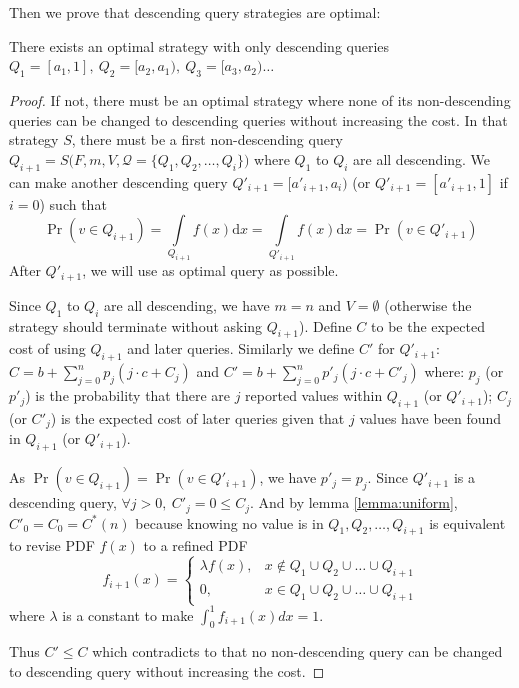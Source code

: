 Then we prove that descending query strategies are optimal:
\begin{lemma}\label{lemma:descending}

There exists an optimal strategy with only descending queries
$Q_1 = [a_1, 1], ~Q_2 = [a_2, a_1), ~Q_3 = [a_3, a_2)\ldots$

\end{lemma}

\begin{proof}

If not, there must be an optimal strategy where none of its
non-descending queries can be changed to descending queries without increasing
the cost. In that strategy $S$, there must be a first non-descending query
$Q_{i+1} = S\big(F, m, V, \mathcal Q = \{Q_1, Q_2, \ldots, Q_i\}\big)$ where
$Q_1$ to $Q_i$ are all descending.  We can make another descending query
$Q'_{i+1} = [a'_{i+1}, a_i)$ (or $Q'_{i+1} = [a'_{i+1}, 1]$ if $i = 0$) such
that
\[
\Pr(v \in Q_{i+1}) = \int \limits_{Q_{i+1}} f(x) \mathrm d x = \int \limits_{Q'_{i+1}} f(x) \mathrm d x = \Pr(v \in Q'_{i+1})
\]
After $Q'_{i+1}$, we will use as optimal query as
possible.

Since $Q_1$ to $Q_i$ are all descending, we have $m = n$ and $V = \emptyset$ (otherwise
the strategy should terminate without asking $Q_{i+1}$).
Define $C$ to be the expected cost of using $Q_{i+1}$ and later queries. Similarly we define $C'$ for $Q'_{i+1}$:\\
$
C = b + \sum_{j=0}^n p_j ( j \cdot c + C_j)
$
and
$
C' = b + \sum_{j=0}^n p'_j ( j \cdot c + C'_j)
$
where:
$p_j$ (or $p'_j$) is the probability that there are $j$ reported values within $Q_{i+1}$ (or $Q'_{i+1}$);
$C_j$ (or $C'_j$) is the expected cost of later queries given that $j$ values have been
found in $Q_{i+1}$ (or $Q'_{i+1}$).

As $\Pr(v \in Q_{i+1}) = \Pr(v \in Q'_{i+1})$, we have $p'_j = p_j$. Since $Q'_{i+1}$ is a
descending query, $\forall j > 0, ~C'_j = 0 \leq C_j$. And by lemma \ref{lemma:uniform},
$C'_0 = C_0 = C^*(n)$ because knowing no value is in $Q_1, Q_2, \ldots, Q_{i+1}$ is equivalent
to revise PDF $f(x)$ to a refined PDF 
\[
f_{i+1}(x) = \begin{cases}
	\lambda f(x), & x \notin Q_1 \cup Q_2 \cup \ldots \cup Q_{i+1} \\
	0, & x \in Q_1 \cup Q_2 \cup \ldots \cup Q_{i+1}
\end{cases}
\]
where $\lambda$ is a constant to make $\int_0^1 f_{i+1}(x) dx = 1$.

Thus $C' \leq C$ which contradicts to that no non-descending query can be changed to
descending query without increasing the cost.

\end{proof}

